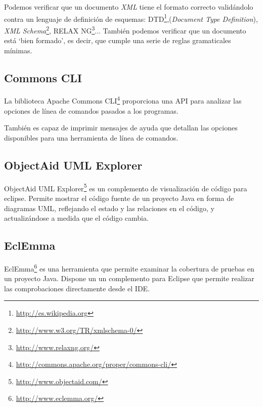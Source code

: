Podemos verificar que un documento \emph{XML} tiene el formato correcto validándolo contra un lenguaje de definición de esquemas: DTD\footnote{\url{http://es.wikipedia.org}},(\emph{Document Type Definition}), \emph{XML Schema}\footnote{\url{http://www.w3.org/TR/xmlschema-0/}}, RELAX NG\footnote{\url{http://www.relaxng.org/}}...
También podemos verificar que un documento está `bien formado', es decir, que cumple una serie de reglas gramaticales mínimas.

\subsection{Commons CLI}
La biblioteca Apache Commons CLI\footnote{\url{http://commons.apache.org/proper/commons-cli/}} proporciona una API para analizar las opciones de línea de comandos pasados a los programas.

También es capaz de imprimir mensajes de ayuda que detallan las opciones disponibles para una herramienta de línea de comandos.

\subsection{ObjectAid UML Explorer}
ObjectAid UML Explorer\footnote{\url{http://www.objectaid.com/}} es un complemento de visualización de código para eclipse.
Permite mostrar el código fuente de un proyecto Java en forma de diagramas UML, reflejando el estado y las relaciones en el código, y actualizándose a medida que el código cambia.


\subsection{EclEmma}
EclEmma\footnote{\url{http://www.eclemma.org/}} es una herramienta que permite examinar la cobertura de pruebas en un proyecto Java.
Dispone un un complemento para Eclipse que permite realizar las comprobaciones directamente desde el IDE.







